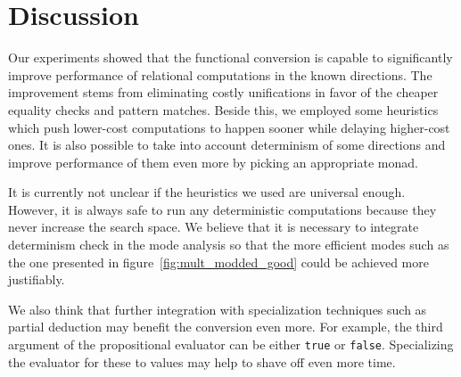 \section{Discussion}

Our experiments showed that the functional conversion is capable to significantly improve performance of relational computations in the known directions.
The improvement stems from eliminating costly unifications in favor of the cheaper equality checks and pattern matches.
Beside this, we employed some heuristics which push lower-cost computations to happen sooner while delaying higher-cost ones.
It is also possible to take into account determinism of some directions and improve performance of them even more by picking an appropriate monad.

It is currently not unclear if the heuristics we used are universal enough.
However, it is always safe to run any deterministic computations because they never increase the search space.
We believe that it is necessary to integrate determinism check in the mode analysis so that the more efficient modes such as the one presented in figure~\ref{fig:mult_modded_good} could be achieved more justifiably.

We also think that further integration with specialization techniques such as partial deduction may benefit the conversion even more.
For example, the third argument of the propositional evaluator can be either \lstinline{true} or \lstinline{false}.
Specializing the evaluator for these to values may help to shave off even more time.
